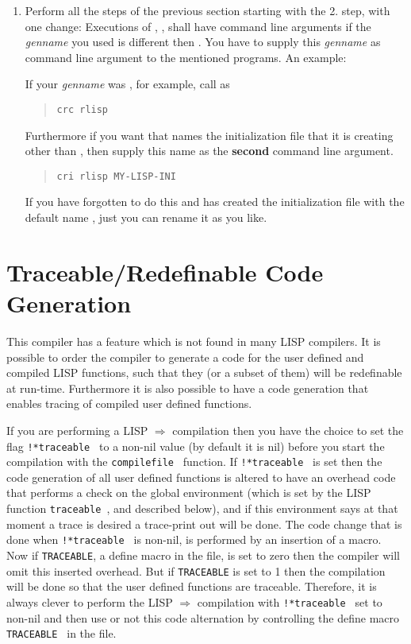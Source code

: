\begin{enumerate}
\item
     Perform all the steps of the previous section starting with the 2. step,
     with one change: Executions of , ,  shall
     have command line arguments if the {\em genname} you used is different
     then . You have to supply this {\em genname} as command line
     argument to the mentioned  programs. An example:

     If your {\em genname} was , for example, call  as
     \begin{quote}
       {\tt crc  rlisp}
     \end{quote}

     Furthermore if you want  that  names
      the initialization file
     that it is creating other than  , then
     supply this name as the {\bf second} command line argument.
     \begin{quote}
       {\tt cri  rlisp MY-LISP-INI}
     \end{quote}
      If you have forgotten to do this and  has created the
      initialization file with the default name  ,
      just you can rename it as you like.
\end{enumerate}



\section{Traceable/Redefinable Code Generation}
This compiler has a feature which is not found in many LISP compilers.
It is possible to order the compiler to generate a code for the user
defined and compiled LISP functions, such that they (or a subset of them)
will  be  redefinable  at  run-time.  Furthermore  it  is  also possible to
have a code generation  that  enables  tracing  of  compiled  user  defined
functions.

If  you  are  performing a  LISP $\Rightarrow$ \C compilation then you have
the choice to set the flag {\tt  !*traceable }  to  a  non-nil  value  (by
 default  it  is  nil) before you start the compilation with the
{\tt  compilefile } function.
If  {\tt   !*traceable }  is  set then the \C code
generation of all user defined functions is altered to have an overhead
code that performs a check on the global environment (which is set
by the LISP function {\tt  traceable }, and described below), and if
this environment says at that moment a trace is desired a trace-print out
will be done. The code change that is done when {\tt   !*traceable } is
non-nil,  is  performed  by  an  insertion  of  a \C macro. Now if
{\tt TRACEABLE},
a \C define macro in the  file, is set to zero then the \C compiler
will omit this inserted overhead. But if  {\tt TRACEABLE} is set to 1 then
the compilation will be  done  so  that  the  user  defined  functions  are
traceable. Therefore, it is always clever to perform the  LISP $\Rightarrow$ \C
compilation with {\tt   !*traceable } set to non-nil and then use or not this
code alternation by controlling
the \C define macro  {\tt TRACEABLE } in the  file.

